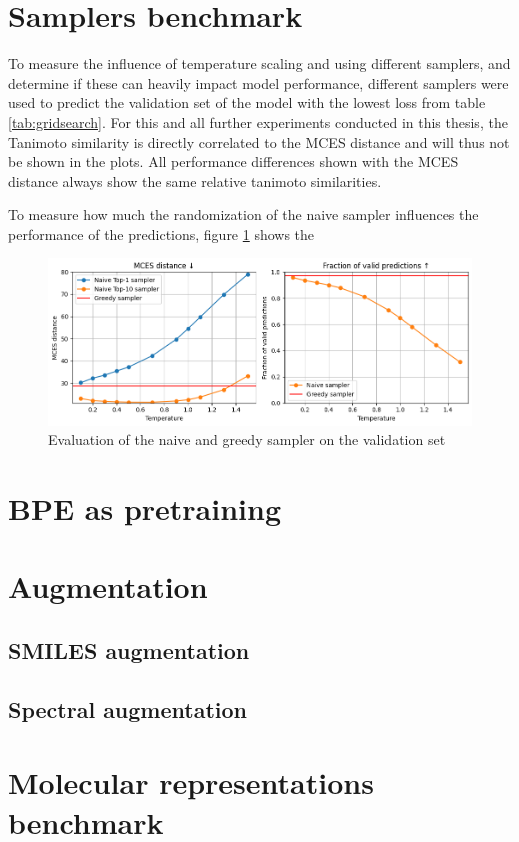 \section{Samplers benchmark}

To measure the influence of temperature scaling and using different samplers, and determine if these can heavily impact model performance, different samplers were used to predict the validation set of the model with the lowest loss from table \ref{tab:gridsearch}.
For this and all further experiments conducted in this thesis, the Tanimoto similarity is directly correlated to the MCES distance and will thus not be shown in the plots.
All performance differences shown with the MCES distance always show the same relative tanimoto similarities.

To measure how much the randomization of the naive sampler influences the performance of the predictions,
figure \ref{fig:naive_and_greedy} shows the 

\begin{figure}[h]
    \centering
    \includegraphics[width=1.0\textwidth]{figures/results/samplers/naive_and_greedy.png}
    \caption{Evaluation of the naive and greedy sampler on the validation set}
    \label{fig:naive_and_greedy}
\end{figure}



\section{\ac{BPE} as pretraining}


\section{Augmentation}

\subsection{SMILES augmentation}

\subsection{Spectral augmentation}


\section{Molecular representations benchmark}